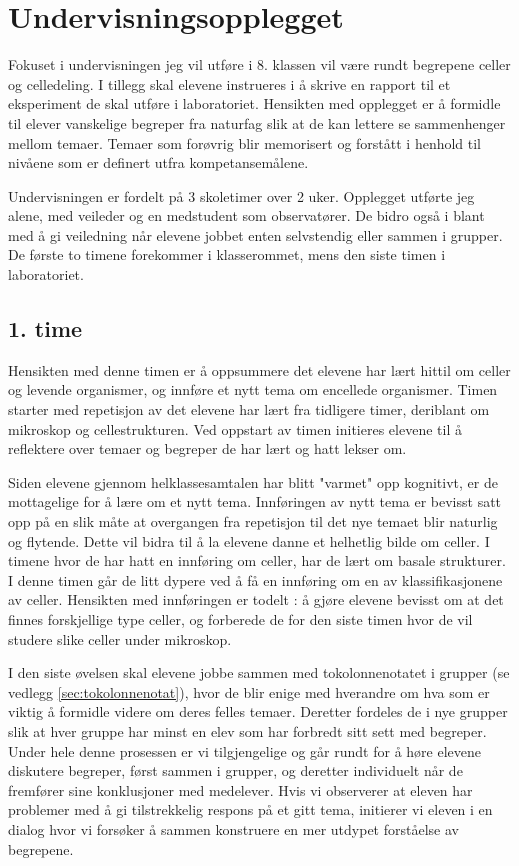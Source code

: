 \documentclass[main.tex]{subfiles}
\begin{document}
\section*{Undervisningsopplegget}
\label{sec:1}
Fokuset i undervisningen jeg vil utføre i 8. klassen vil være rundt begrepene celler og celledeling. 
I tillegg skal elevene instrueres i å skrive en rapport til et eksperiment de skal utføre i laboratoriet.
Hensikten med opplegget er å formidle til elever vanskelige begreper fra naturfag slik at de kan lettere 
se sammenhenger mellom temaer. Temaer som forøvrig blir memorisert og forstått i henhold til nivåene 
som er definert utfra kompetansemålene. 

Undervisningen er fordelt på 3 skoletimer over 2 uker. Opplegget utførte jeg alene, med veileder og en 
medstudent som observatører. De bidro også i blant med å gi veiledning når elevene jobbet enten 
selvstendig eller sammen i grupper. De første to timene forekommer i klasserommet, mens den siste timen 
i laboratoriet.

\subsection*{1. time}

Hensikten med denne timen er å oppsummere det elevene har lært hittil om celler og 
levende organismer, og innføre et nytt tema om encellede organismer. Timen starter med repetisjon 
av det elevene har lært fra tidligere timer, deriblant om mikroskop og cellestrukturen. Ved oppstart 
av timen initieres elevene til å reflektere over temaer og begreper de har lært og hatt lekser 
om.
 
Siden elevene gjennom helklassesamtalen har blitt "varmet" opp kognitivt, er de mottagelige for å 
lære om et nytt tema. Innføringen av nytt tema er bevisst satt opp på en slik måte at overgangen 
fra repetisjon til det nye temaet blir naturlig og flytende. Dette vil bidra til å la elevene danne et 
helhetlig bilde om celler. I timene hvor de har hatt en innføring om celler, har de lært om basale 
strukturer. I denne timen går de litt dypere ved å få en innføring om en av klassifikasjonene av celler.
Hensikten med innføringen er todelt : å gjøre elevene bevisst om at det finnes forskjellige type
celler, og forberede de for den siste timen hvor de vil studere slike celler under mikroskop.
 
I den siste øvelsen skal elevene jobbe sammen med tokolonnenotatet i grupper (se 
vedlegg \ref{sec:tokolonnenotat}), hvor de blir enige med hverandre om hva som er viktig å formidle videre 
om deres felles temaer. Deretter fordeles de i nye grupper slik at hver gruppe har minst en elev som har 
forbredt sitt sett med begreper. Under hele denne prosessen er vi tilgjengelige og går rundt for å 
høre elevene diskutere begreper, først sammen i grupper, og deretter individuelt når de fremfører sine 
konklusjoner med medelever. Hvis vi observerer at eleven har problemer med å gi tilstrekkelig 
respons på et gitt tema, initierer vi eleven i en dialog hvor vi forsøker å sammen konstruere en 
mer utdypet forståelse av begrepene. 
\end{document}
